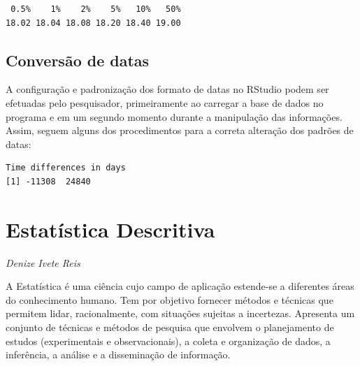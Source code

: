 \documentclass[12pt,brazil,]{book}
\newenvironment{Shaded}{\begin{snugshade}}{\end{snugshade}}
\newcommand{\CommentTok}[1]{\textcolor[rgb]{0.56,0.35,0.01}{\textit{#1}}}
\newcommand{\DataTypeTok}[1]{\textcolor[rgb]{0.13,0.29,0.53}{#1}}
\newcommand{\KeywordTok}[1]{\textcolor[rgb]{0.13,0.29,0.53}{\textbf{#1}}}
\newcommand{\NormalTok}[1]{#1}
\newcommand{\OperatorTok}[1]{\textcolor[rgb]{0.81,0.36,0.00}{\textbf{#1}}}
\newcommand{\StringTok}[1]{\textcolor[rgb]{0.31,0.60,0.02}{#1}}
\begin{document}
\begin{verbatim}
 0.5%    1%    2%    5%   10%   50% 
18.02 18.04 18.08 18.20 18.40 19.00 
\end{verbatim}

\hypertarget{conversao-de-datas}{%
\section{Conversão de datas}\label{conversao-de-datas}}

A configuração e padronização dos formato de datas no RStudio podem ser
efetuadas pelo pesquisador, primeiramente ao carregar a base de dados no
programa e em um segundo momento durante a manipulação das informações.
Assim, seguem alguns dos procedimentos para a correta alteração dos
padrões de datas:

\begin{Shaded}
\end{Shaded}

\begin{verbatim}
Time differences in days
[1] -11308  24840
\end{verbatim}

\hypertarget{estatistica-descritiva}{%
\chapter{Estatística Descritiva}\label{estatistica-descritiva}}

\begin{flushright}
\emph{Denize Ivete Reis}
\end{flushright}

A Estatística é uma ciência cujo campo de aplicação estende-se a
diferentes áreas do conhecimento humano. Tem por objetivo fornecer
métodos e técnicas que permitem lidar, racionalmente, com situações
sujeitas a incertezas. Apresenta um conjunto de técnicas e métodos de
pesquisa que envolvem o planejamento de estudos (experimentais e
observacionais), a coleta e organização de dados, a inferência, a
análise e a disseminação de informação.
\end{document}
